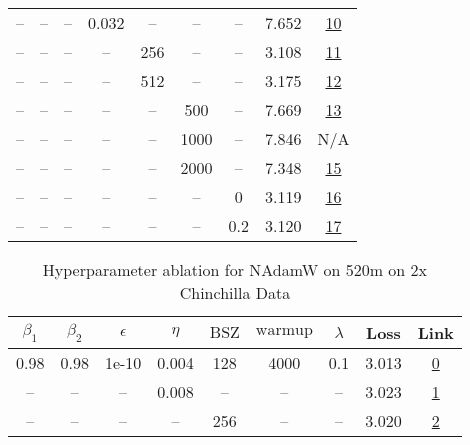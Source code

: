 \begin{table}[H]
\begin{tabular}{ccccccccc}
-- & -- & -- & 0.032 & -- & -- & -- & 7.652 & \href{https://wandb.ai/stanford-mercury/optimizer-scaling/runs/sweep-520m-10B-nadamw81378dlr0.032-wd0.1-minlr0-warmup4000-b10.9-cf07ef}{10} \\
-- & -- & -- & -- & 256 & -- & -- & 3.108 & \href{https://wandb.ai/stanford-mercury/optimizer-scaling/runs/sweep-520m-10B-nadamw6b0927lr0.008-wd0.1-minlr0-warmup4000-b10.9-c4e187}{11} \\
-- & -- & -- & -- & 512 & -- & -- & 3.175 & \href{https://wandb.ai/stanford-mercury/optimizer-scaling/runs/sweep-520m-10B-nadamwf82029lr0.008-wd0.1-minlr0-warmup4000-b10.9-e82d44}{12} \\
-- & -- & -- & -- & -- & 500 & -- & 7.669 & \href{https://wandb.ai/stanford-mercury/optimizer-scaling/runs/sweep-520m-10B-nadamwfcce14lr0.008-wd0.1-minlr0-warmup500-b10.95-f8816f}{13} \\
-- & -- & -- & -- & -- & 1000 & -- & 7.846 & N/A \\
-- & -- & -- & -- & -- & 2000 & -- & 7.348 & \href{https://wandb.ai/stanford-mercury/optimizer-scaling/runs/sweep-520m-10B-nadamwaee88elr0.008-wd0.1-minlr0-warmup2000-b10.9-2daeb0}{15} \\
-- & -- & -- & -- & -- & -- & 0 & 3.119 & \href{https://wandb.ai/stanford-mercury/optimizer-scaling/runs/sweep-520m-10B-nadamw6f2a4alr0.008-wd0-minlr0-warmup4000-b10.95--957125}{16} \\
-- & -- & -- & -- & -- & -- & 0.2 & 3.120 & \href{https://wandb.ai/stanford-mercury/optimizer-scaling/runs/sweep-520m-10B-nadamwaaf07flr0.008-wd0.2-minlr0-warmup4000-b10.9-4b1531}{17} \\
\bottomrule
\end{tabular}
\end{table}

\begin{table}[H]
\centering
\caption{Hyperparameter ablation for NAdamW on 520m on 2x Chinchilla Data}
\label{tab:ablation_nadamw_520m_2}
\begin{tabular}{ccccccccc}
\toprule
$\beta_1$ & $\beta_2$ & $\epsilon$ & $\eta$ & $\mathrm{BSZ}$ & $\mathrm{warmup}$ & $\lambda$ & Loss & Link \\
\midrule
0.98 & 0.98 & 1e-10 & 0.004 & 128 & 4000 & 0.1 & 3.013 & \href{https://wandb.ai/stanford-mercury/optimizer-scaling/runs/sweep-520m-21B-nadamw0a1fe6lr0.004-wd0.1-minlr0-warmup4000-b10.9-2d3f42}{0} \\
\midrule
-- & -- & -- & 0.008 & -- & -- & -- & 3.023 & \href{https://wandb.ai/stanford-mercury/optimizer-scaling/runs/sweep-520m-21B-nadamw999646lr0.008-wd0.1-minlr0-warmup4000-b10.9-e42d78}{1} \\
-- & -- & -- & -- & 256 & -- & -- & 3.020 & \href{https://wandb.ai/stanford-mercury/optimizer-scaling/runs/sweep-520m-21B-nadamw98f1d8lr0.004-wd0.1-minlr0-warmup4000-b10.9-727fdb}{2} \\
\bottomrule
\end{tabular}
\end{table}

